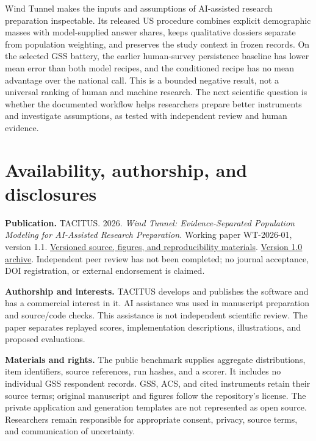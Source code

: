 \documentclass[
  11pt,
]{article}
\let\originalsection\section
\renewcommand{\section}{\Needspace{5\baselineskip}\originalsection}
\begin{document}
Wind Tunnel makes the inputs and assumptions of AI-assisted research
preparation inspectable. Its released US procedure combines explicit
demographic masses with model-supplied answer shares, keeps qualitative
dossiers separate from population weighting, and preserves the study
context in frozen records. On the selected GSS battery, the earlier
human-survey persistence baseline has lower mean error than both model
recipes, and the conditioned recipe has no mean advantage over the
national call. This is a bounded negative result, not a universal
ranking of human and machine research. The next scientific question is
whether the documented workflow helps researchers prepare better
instruments and investigate assumptions, as tested with independent
review and human evidence.

\section{Availability, authorship, and
disclosures}\label{availability-authorship-and-disclosures}

\textbf{Publication.} TACITUS. 2026. \emph{Wind Tunnel:
Evidence-Separated Population Modeling for AI-Assisted Research
Preparation.} Working paper WT-2026-01, version 1.1.
\href{https://github.com/sargonxg/TACITUS-Knowledge-Pipeline-open/tree/main/research/wind-tunnel-methodology/v1.1}{Versioned
source, figures, and reproducibility materials}.
\href{https://tacitus.me/research/wind-tunnel/paper/}{Version 1.0
archive}. Independent peer review has not been completed; no journal
acceptance, DOI registration, or external endorsement is claimed.

\textbf{Authorship and interests.} TACITUS develops and publishes the
software and has a commercial interest in it. AI assistance was used in
manuscript preparation and source/code checks. This assistance is not
independent scientific review. The paper separates replayed scores,
implementation descriptions, illustrations, and proposed evaluations.

\textbf{Materials and rights.} The public benchmark supplies aggregate
distributions, item identifiers, source references, run hashes, and a
scorer. It includes no individual GSS respondent records. GSS, ACS, and
cited instruments retain their source terms; original manuscript and
figures follow the repository's license. The private application and
generation templates are not represented as open source. Researchers
remain responsible for appropriate consent, privacy, source terms, and
communication of uncertainty.
\end{document}
